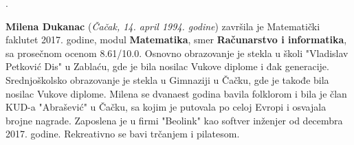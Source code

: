 \documentclass[12pt,oneside]{memoir}
\begin{document}

.%

\literatura

\backmatter

\begin{biografija}
  \textbf{Milena Dukanac} (\emph{Čačak,
    14. april 1994. godine}) završila je Matematički faklutet 2017. godine, modul \textbf{Matematika}, smer \textbf{Računarstvo i informatika}, sa prosečnom ocenom 8.61/10.0. Osnovno obrazovanje je stekla u školi "Vladislav Petković Dis" u Zablaću, gde je bila nosilac Vukove diplome i đak generacije. Srednjoškolsko obrazovanje je stekla u Gimnaziji u Čačku, gde je takođe bila nosilac Vukove diplome. Milena se dvanaest godina bavila folklorom i bila je član KUD-a "Abrašević" u Čačku, sa kojim je putovala po celoj Evropi i osvajala brojne nagrade. Zaposlena je u firmi "Beolink" kao softver inženjer od decembra 2017. godine. Rekreativno se bavi trčanjem i pilatesom.
\end{biografija}
\end{document}
